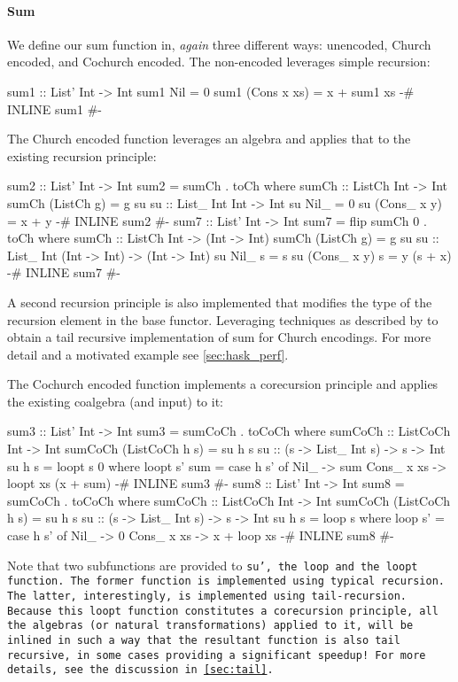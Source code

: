 \paragraph{Sum}
We define our sum function in, \textit{again} three different ways:
unencoded, Church encoded, and Cochurch encoded.
The non-encoded leverages simple recursion:
\begin{code}
sum1 :: List' Int -> Int
sum1 Nil = 0
sum1 (Cons x xs) = x + sum1 xs
{-# INLINE sum1 #-}
\end{code}
The Church encoded function leverages an algebra and applies that to the existing recursion principle:
\begin{code}
sum2 :: List' Int -> Int
sum2 = sumCh . toCh
  where sumCh :: ListCh Int -> Int
        sumCh (ListCh g) = g su
        su :: List_ Int Int -> Int
        su Nil_ = 0
        su (Cons_ x y) = x + y
{-# INLINE sum2 #-}
sum7 :: List' Int -> Int
sum7 = flip sumCh 0 . toCh
  where sumCh :: ListCh Int -> (Int -> Int)
        sumCh (ListCh g) = g su
        su :: List_ Int (Int -> Int) -> (Int -> Int)
        su Nil_ s = s
        su (Cons_ x y) s = y (s + x)
{-# INLINE sum7 #-}
\end{code}
A second recursion principle is also implemented that modifies the type of the recursion element in the base functor.
Leveraging techniques as described by \cite{Breitner2018} to obtain a tail recursive implementation of sum for Church encodings.
For more detail and a motivated example see \autoref{sec:hask_perf}. 

The Cochurch encoded function implements a corecursion principle and applies the existing coalgebra (and input) to it:
\begin{code}
sum3 :: List' Int -> Int
sum3 = sumCoCh . toCoCh
  where sumCoCh :: ListCoCh Int -> Int
        sumCoCh (ListCoCh h s) = su h s
        su :: (s -> List_ Int s) -> s -> Int
        su h s = loopt s 0
          where loopt s' sum = case h s' of
                  Nil_ -> sum
                  Cons_ x xs -> loopt xs (x + sum)
{-# INLINE sum3 #-}
sum8 :: List' Int -> Int
sum8 = sumCoCh . toCoCh
  where sumCoCh :: ListCoCh Int -> Int
        sumCoCh (ListCoCh h s) = su h s
        su :: (s -> List_ Int s) -> s -> Int
        su h s = loop s
          where loop s' = case h s' of
                  Nil_ -> 0
                  Cons_ x xs -> x + loop xs
{-# INLINE sum8 #-}
\end{code}
Note that two subfunctions are provided to \tt{su'}, the \tt{loop} and the \tt{loopt} function.
The former function is implemented using typical recursion.
The latter, interestingly, is implemented using tail-recursion.
Because this \tt{loopt} function constitutes a corecursion principle, all the algebras (or natural transformations) applied to it, will be inlined in such a way that the resultant function is also tail recursive, in some cases providing a significant speedup!
For more details, see the discussion in \autoref{sec:tail}.


